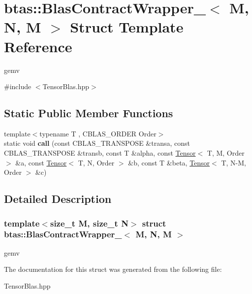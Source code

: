 \hypertarget{structbtas_1_1_blas_contract_wrapper___3_01_m_00_01_n_00_01_m_01_4}{
\section{btas::BlasContractWrapper\_\-$<$ M, N, M $>$ Struct Template Reference}
\label{structbtas_1_1_blas_contract_wrapper___3_01_m_00_01_n_00_01_m_01_4}
}


gemv  


{\ttfamily \#include $<$TensorBlas.hpp$>$}\subsection*{Static Public Member Functions}
\begin{DoxyCompactItemize}
\item 
\hypertarget{structbtas_1_1_blas_contract_wrapper___3_01_m_00_01_n_00_01_m_01_4_a7b1430f2cf7701fafcfe352a9b8dc83a}{
{\footnotesize template$<$typename T , CBLAS\_\-ORDER Order$>$ }\\static void {\bfseries call} (const CBLAS\_\-TRANSPOSE \&transa, const CBLAS\_\-TRANSPOSE \&transb, const T \&alpha, const \hyperlink{classbtas_1_1_tensor}{Tensor}$<$ T, M, Order $>$ \&a, const \hyperlink{classbtas_1_1_tensor}{Tensor}$<$ T, N, Order $>$ \&b, const T \&beta, \hyperlink{classbtas_1_1_tensor}{Tensor}$<$ T, N-\/M, Order $>$ \&c)}
\label{structbtas_1_1_blas_contract_wrapper___3_01_m_00_01_n_00_01_m_01_4_a7b1430f2cf7701fafcfe352a9b8dc83a}

\end{DoxyCompactItemize}


\subsection{Detailed Description}
\subsubsection*{template$<$size\_\-t M, size\_\-t N$>$ struct btas::BlasContractWrapper\_\-$<$ M, N, M $>$}

gemv 

The documentation for this struct was generated from the following file:\begin{DoxyCompactItemize}
\item 
TensorBlas.hpp\end{DoxyCompactItemize}
